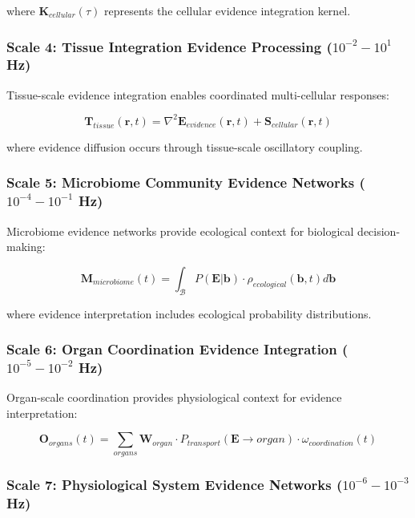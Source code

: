 \documentclass[12pt,a4paper]{article}
\begin{document}
where $\mathbf{K}_{cellular}(\tau)$ represents the cellular evidence integration kernel.

\subsubsection{Scale 4: Tissue Integration Evidence Processing ($10^{-2}-10^1$ Hz)}

Tissue-scale evidence integration enables coordinated multi-cellular responses:

\begin{equation}
\mathbf{T}_{tissue}(\mathbf{r}, t) = \nabla^2 \mathbf{E}_{evidence}(\mathbf{r}, t) + \mathbf{S}_{cellular}(\mathbf{r}, t)
\end{equation}

where evidence diffusion occurs through tissue-scale oscillatory coupling.

\subsubsection{Scale 5: Microbiome Community Evidence Networks ($10^{-4}-10^{-1}$ Hz)}

Microbiome evidence networks provide ecological context for biological decision-making:

\begin{equation}
\mathbf{M}_{microbiome}(t) = \int_{\mathcal{B}} P(\mathbf{E}|\mathbf{b}) \cdot \rho_{ecological}(\mathbf{b}, t) d\mathbf{b}
\end{equation}

where evidence interpretation includes ecological probability distributions.

\subsubsection{Scale 6: Organ Coordination Evidence Integration ($10^{-5}-10^{-2}$ Hz)}

Organ-scale coordination provides physiological context for evidence interpretation:

\begin{equation}
\mathbf{O}_{organs}(t) = \sum_{organs} \mathbf{W}_{organ} \cdot P_{transport}(\mathbf{E} \to organ) \cdot \omega_{coordination}(t)
\end{equation}

\subsubsection{Scale 7: Physiological System Evidence Networks ($10^{-6}-10^{-3}$ Hz)}
\end{document}
